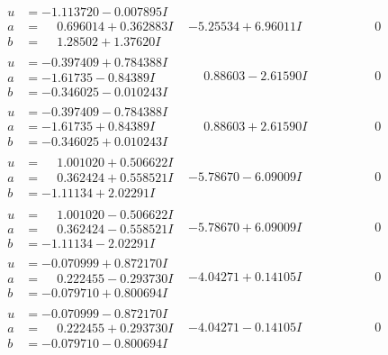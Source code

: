 \documentclass[1p]{elsarticle_modified}
\theoremstyle{definition}
\begin{document}
$$\begin{array}{c|c|c}
\begin{aligned}
u &= -1.113720 - 0.007895 I \\
a &= \phantom{-}0.696014 + 0.362883 I \\
b &= \phantom{-}1.28502 + 1.37620 I\end{aligned}
 & -5.25534 + 6.96011 I & \phantom{-0.000000 } 0 \\ \hline\begin{aligned}
u &= -0.397409 + 0.784388 I \\
a &= -1.61735 - 0.84389 I \\
b &= -0.346025 - 0.010243 I\end{aligned}
 & \phantom{-}0.88603 - 2.61590 I & \phantom{-0.000000 } 0 \\ \hline\begin{aligned}
u &= -0.397409 - 0.784388 I \\
a &= -1.61735 + 0.84389 I \\
b &= -0.346025 + 0.010243 I\end{aligned}
 & \phantom{-}0.88603 + 2.61590 I & \phantom{-0.000000 } 0 \\ \hline\begin{aligned}
u &= \phantom{-}1.001020 + 0.506622 I \\
a &= \phantom{-}0.362424 + 0.558521 I \\
b &= -1.11134 + 2.02291 I\end{aligned}
 & -5.78670 - 6.09009 I & \phantom{-0.000000 } 0 \\ \hline\begin{aligned}
u &= \phantom{-}1.001020 - 0.506622 I \\
a &= \phantom{-}0.362424 - 0.558521 I \\
b &= -1.11134 - 2.02291 I\end{aligned}
 & -5.78670 + 6.09009 I & \phantom{-0.000000 } 0 \\ \hline\begin{aligned}
u &= -0.070999 + 0.872170 I \\
a &= \phantom{-}0.222455 - 0.293730 I \\
b &= -0.079710 + 0.800694 I\end{aligned}
 & -4.04271 + 0.14105 I & \phantom{-0.000000 } 0 \\ \hline\begin{aligned}
u &= -0.070999 - 0.872170 I \\
a &= \phantom{-}0.222455 + 0.293730 I \\
b &= -0.079710 - 0.800694 I\end{aligned}
 & -4.04271 - 0.14105 I & \phantom{-0.000000 } 0\\

\end{array}$$
\end{document}
